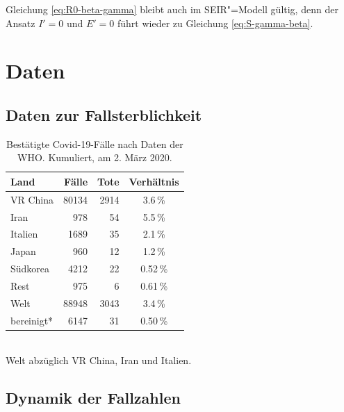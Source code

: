 \documentclass[a4paper,11pt,fleqn,twocolumn,twoside,dvipdfmx]{scrartcl}
\numberwithin{equation}{section}
\newcommand{\strong}[1]{\textbf{#1}}
\begin{document}
Gleichung \eqref{eq:R0-beta-gamma} bleibt auch im SEIR"=Modell gültig,
denn der Ansatz $I'=0$ und $E'=0$ führt wieder zu Gleichung
\eqref{eq:S-gamma-beta}.

\newpage
\section{Daten}

\subsection{Daten zur Fallsterblichkeit}
\begin{table}[h]
\caption{Bestätigte Covid-19-Fälle\newline
nach Daten der WHO.\newline
Kumuliert, am 2. März 2020.}
\begin{tabular}{lrrc}
\toprule
\strong{Land} & \strong{Fälle} & \strong{Tote} & \strong{Verhältnis}\\
\midrule
VR China & 80134 & 2914 & 3.6\,\%\\
Iran & 978 & 54 & 5.5\,\%\\ 
Italien & 1689 & 35 & 2.1\,\%\\
Japan & 960 & 12 &  1.2\,\%\\
Südkorea & 4212 & 22 & 0.52\,\%\\
Rest & 975 & 6 & 0.61\,\%\\
\midrule
Welt & 88948 & 3043 & 3.4\,\%\\
bereinigt* & 6147 & 31 & 0.50\,\%\\
\bottomrule
\end{tabular}\\[4pt]
{\small *Welt abzüglich VR China, Iran und Italien.}
\end{table}

\subsection{Dynamik der Fallzahlen}
\end{document}
